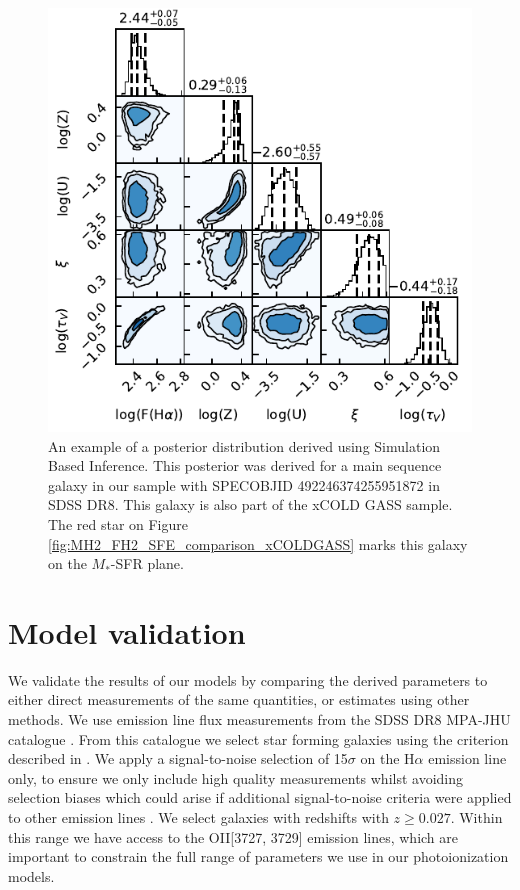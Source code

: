\documentclass[fleqn,usenatbib]{mnras}
\begin{document}
\begin{figure}
    \centering
    \includegraphics[width=\columnwidth]{figures/fig2.pdf}
    \caption{An example of a posterior distribution derived using Simulation Based Inference. This posterior was derived for a main sequence galaxy in our sample with SPECOBJID 492246374255951872 in SDSS DR8. This galaxy is also part of the xCOLD GASS sample. The red star on Figure \ref{fig:MH2_FH2_SFE_comparison_xCOLDGASS} marks this galaxy on the $M_{*}$-SFR plane.}
    \label{fig:corner_plot_example}
\end{figure}

\section{Model validation}
\label{sec:model_validation}
We validate the results of our models by comparing the derived parameters to either direct measurements of the same quantities, or estimates using other methods. We use emission line flux measurements from the SDSS DR8 MPA-JHU catalogue \citep{brinchmann2004, kauffmann2003a, tremonti2004}. From this catalogue we select star forming galaxies using the criterion described in \cite{kauffmann2003}. We apply a signal-to-noise selection of 15$\sigma$ on the H$\alpha$ emission line only, to ensure we only include high quality measurements whilst avoiding selection biases which could arise if additional signal-to-noise criteria were applied to other emission lines \citep{yates2012, kashino2016}. We select galaxies with redshifts with $z \geq 0.027$. Within this range we have access to the OII[3727, 3729] emission lines, which are important to constrain the full range of parameters we use in our photoionization models.
\end{document}
